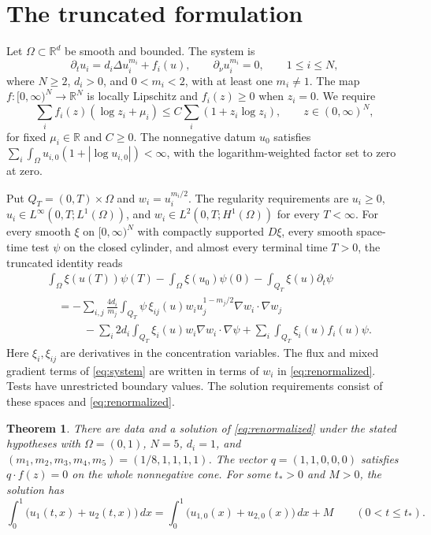 \documentclass[11pt]{article}
\newtheorem{theorem}{Theorem}
\begin{document}
\section{The truncated formulation}

Let \(\Omega\subset\mathbb R^d\) be smooth and bounded. The system is
\begin{equation}
 \partial_t u_i=d_i\Delta u_i^{m_i}+f_i(u),\qquad
 \partial_\nu u_i^{m_i}=0,\qquad 1\le i\le N ,
 \label{eq:system}
\end{equation}
where \(N\ge 2\), \(d_i>0\), and \(0<m_i<2\), with at least one \(m_i\ne1\).
The map \(f:[0,\infty)^N\to\mathbb R^N\) is locally Lipschitz and \(f_i(z)\ge0\)
when \(z_i=0\). We require
\begin{equation}
 \sum_i f_i(z)(\log z_i+\mu_i)
 \le C\sum_i(1+z_i\log z_i),\qquad z\in(0,\infty)^N ,
 \label{eq:entropy}
\end{equation}
for fixed \(\mu_i\in\mathbb R\) and \(C\ge0\). The nonnegative datum \(u_0\)
satisfies \(\sum_i\int_\Omega u_{i,0}(1+|\log u_{i,0}|)<\infty\),
with the logarithm-weighted factor set to zero at zero.

Put \(Q_T=(0,T)\times\Omega\) and \(w_i=u_i^{m_i/2}\). The regularity
requirements are \(u_i\ge0\), \(u_i\in L^\infty(0,T;L^1(\Omega))\), and
\(w_i\in L^2(0,T;H^1(\Omega))\) for every \(T<\infty\).
For every smooth \(\xi\) on \([0,\infty)^N\) with compactly supported \(D\xi\),
every smooth space-time test \(\psi\) on the closed cylinder, and almost every
terminal time \(T>0\), the truncated identity reads
\begin{equation}
\begin{aligned}
 &\int_\Omega \xi(u(T))\psi(T)-\int_\Omega \xi(u_0)\psi(0)
       -\int_{Q_T}\xi(u)\partial_t\psi\\
 &\quad=-\sum_{i,j}\frac{4d_i}{m_j}\int_{Q_T}
       \psi\,\xi_{ij}(u)w_i u_j^{1-m_j/2}\nabla w_i\cdot\nabla w_j\\
 &\qquad\phantom{=}-\sum_i2d_i\int_{Q_T}\xi_i(u)w_i\nabla w_i\cdot\nabla\psi
       +\sum_i\int_{Q_T}\xi_i(u)f_i(u)\psi .
\end{aligned}
\label{eq:renormalized}
\end{equation}
Here \(\xi_i,\xi_{ij}\) are derivatives in the concentration variables.
The flux and mixed gradient terms of \eqref{eq:system} are written
in terms of \(w_i\) in \eqref{eq:renormalized}. Tests have unrestricted
boundary values. The solution requirements consist of these spaces and
\eqref{eq:renormalized}.

\begin{theorem}\label{thm:counterexample}
There are data and a solution of \eqref{eq:renormalized} under the stated
hypotheses with \(\Omega=(0,1)\), \(N=5\), \(d_i=1\), and
\((m_1,m_2,m_3,m_4,m_5)=(1/8,1,1,1,1)\). The vector \(q=(1,1,0,0,0)\)
satisfies \(q\cdot f(z)=0\) on the whole nonnegative cone. For some
\(t_*>0\) and \(M>0\), the solution has
\[
 \int_0^1\bigl(u_1(t,x)+u_2(t,x)\bigr)\,dx
 =\int_0^1\bigl(u_{1,0}(x)+u_{2,0}(x)\bigr)\,dx+M
 \qquad (0<t\le t_*) .
\]
\end{theorem}
\end{document}
